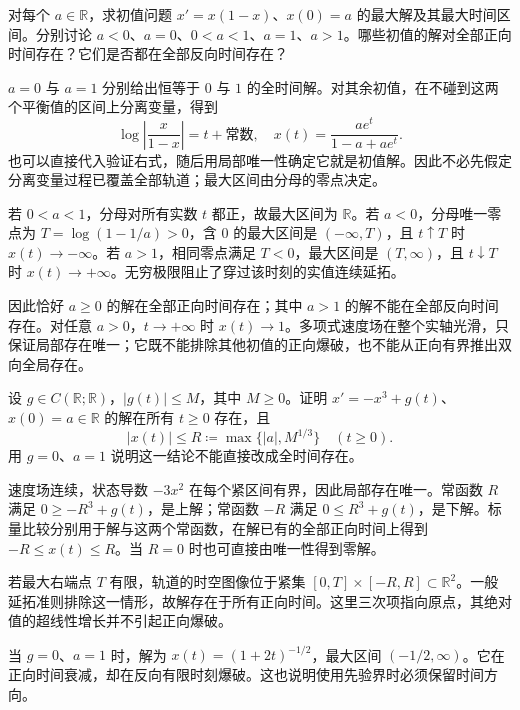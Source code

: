 \begin{exercise}[同一方程的不同最大区间]\label{b2:ex:ode-logistic}
对每个 \(a\in\mathbb R\)，求初值问题 \(x'=x(1-x)\)、\(x(0)=a\) 的最大解及其最大时间区间。分别讨论 \(a<0\)、\(a=0\)、\(0<a<1\)、\(a=1\)、\(a>1\)。哪些初值的解对全部正向时间存在？它们是否都在全部反向时间存在？
\end{exercise}
\begin{solution}
\(a=0\) 与 \(a=1\) 分别给出恒等于 \(0\) 与 \(1\) 的全时间解。对其余初值，在不碰到这两个平衡值的区间上分离变量，得到
\[
 \log\left|\frac{x}{1-x}\right|=t+\text{常数},\quad
 x(t)=\frac{ae^t}{1-a+ae^t}.
\]
也可以直接代入验证右式，随后用局部唯一性确定它就是初值解。因此不必先假定分离变量过程已覆盖全部轨道；最大区间由分母的零点决定。

若 \(0<a<1\)，分母对所有实数 \(t\) 都正，故最大区间为 \(\mathbb R\)。若 \(a<0\)，分母唯一零点为 \(T=\log(1-1/a)>0\)，含 \(0\) 的最大区间是 \((-\infty,T)\)，且 \(t\uparrow T\) 时 \(x(t)\to-\infty\)。若 \(a>1\)，相同零点满足 \(T<0\)，最大区间是 \((T,\infty)\)，且 \(t\downarrow T\) 时 \(x(t)\to+\infty\)。无穷极限阻止了穿过该时刻的实值连续延拓。

因此恰好 \(a\geq0\) 的解在全部正向时间存在；其中 \(a>1\) 的解不能在全部反向时间存在。对任意 \(a>0\)，\(t\to+\infty\) 时 \(x(t)\to1\)。多项式速度场在整个实轴光滑，只保证局部存在唯一；它既不能排除其他初值的正向爆破，也不能从正向有界推出双向全局存在。
\end{solution}

\begin{exercise}[超线性速度与正向控制]\label{b2:ex:ode-forced-dissipation}
设 \(g\in C(\mathbb R;\mathbb R)\)，\(|g(t)|\leq M\)，其中 \(M\geq0\)。证明 \(x'=-x^3+g(t)\)、\(x(0)=a\in\mathbb R\) 的解在所有 \(t\geq0\) 存在，且
\[
 |x(t)|\leq R\coloneqq\max\{|a|,M^{1/3}\}\quad(t\geq0).
\]
用 \(g=0\)、\(a=1\) 说明这一结论不能直接改成全时间存在。
\end{exercise}
\begin{solution}
速度场连续，状态导数 \(-3x^2\) 在每个紧区间有界，因此局部存在唯一。常函数 \(R\) 满足 \(0\geq-R^3+g(t)\)，是上解；常函数 \(-R\) 满足 \(0\leq R^3+g(t)\)，是下解。标量比较分别用于解与这两个常函数，在解已有的全部正向时间上得到 \(-R\leq x(t)\leq R\)。当 \(R=0\) 时也可直接由唯一性得到零解。

若最大右端点 \(T\) 有限，轨道的时空图像位于紧集 \([0,T]\times[-R,R]\subset\mathbb R^2\)。一般延拓准则排除这一情形，故解存在于所有正向时间。这里三次项指向原点，其绝对值的超线性增长并不引起正向爆破。

当 \(g=0\)、\(a=1\) 时，解为 \(x(t)=(1+2t)^{-1/2}\)，最大区间 \((-1/2,\infty)\)。它在正向时间衰减，却在反向有限时刻爆破。这也说明使用先验界时必须保留时间方向。
\end{solution}


